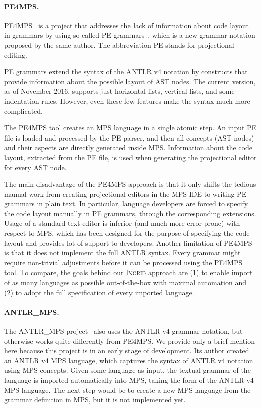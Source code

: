 
\paragraph{PE4MPS.}
PE4MPS~\cite{ref:PE4MPS} is a project that addresses the lack of information about code layout in grammars by using so called PE grammars~\cite{ref:PE}, which is a new grammar notation proposed by the same author.
The abbreviation PE stands for projectional editing.

PE grammars extend the syntax of the ANTLR v4 notation by constructs that provide information about the possible layout of AST nodes.
 The current version, as of November 2016, supports just horizontal lists, vertical lists, and some indentation rules.
However, even these few features make the syntax much more complicated.

The PE4MPS tool creates an MPS language in a single atomic step.
An input PE file is loaded and processed by the PE parser, and then all concepts (AST nodes) and their aspects are directly generated inside MPS.
Information about the code layout, extracted from the PE file, is used when generating the projectional editor for every AST node.

The main disadvantage of the PE4MPS approach is that it only shifts the tedious manual work from creating projectional editors in the MPS IDE to writing PE grammars in plain text.
In particular, language developers are forced to specify the code layout manually in PE grammars, through the corresponding extensions.
Usage of a standard text editor is inferior (and much more error-prone) with respect to MPS, which has been designed for the purpose of specifying the code layout and provides lot of support to developers.
Another limitation of PE4MPS is that it does not implement the full ANTLR syntax.
Every grammar might require non-trivial adjustments before it can be processed using the PE4MPS tool.
To compare, the goals behind our \textsc{Ingrid} approach are (1) to enable import of as many languages as possible out-of-the-box with maximal automation and (2) to adopt the full specification of every imported language.

\paragraph{ANTLR{\_}MPS.}
The ANTLR{\_}MPS project~\cite{ref:ANTLR2MPS} also uses the ANTLR v4 grammar notation, but otherwise works quite differently from PE4MPS.
We provide only a brief mention here because this project is in an early stage of development.
Its author created an ANTLR v4 MPS language, which captures the syntax of ANTLR v4 notation using MPS concepts.
Given some language as input, the textual grammar of the language is imported automatically into MPS, taking the form of the ANTLR v4 MPS language.
The next step would be to create a new MPS language from the grammar definition in MPS, but it is not implemented yet.


